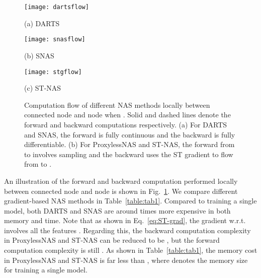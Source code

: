 \documentclass{article}
\newcommand{\figref}{Fig.~\ref}
\newcommand{\tabref}{Table~\ref}
\newcommand{\neqref}{Eq.~\eqref}
\begin{document}
\begin{figure}[t]
    \begin{minipage}[b]{0.32\linewidth}
        \centering
        \texttt{[image: dartsflow]}
\centerline{(a) DARTS}\medskip
    \end{minipage}
    \begin{minipage}[b]{0.32\linewidth}
        \centering
        \texttt{[image: snasflow]}
\centerline{(b) SNAS}\medskip
    \end{minipage}
    \begin{minipage}[b]{0.32\linewidth}
        \centering
        \texttt{[image: stgflow]}
\centerline{(c) ST-NAS}\medskip
    \end{minipage}
\vspace{-4mm}
    \caption{Computation flow of different NAS methods locally between connected node and node when . Solid and dashed lines denote the forward and backward computations respectively. (a) For DARTS and SNAS, the forward is fully continuous and the backward is fully differentiable. (b) For ProxylessNAS and ST-NAS, the forward from  to  involves sampling and the backward uses the ST gradient to flow from  to .}
    \label{fig:compute-flow}
\end{figure}


An illustration of the forward and backward computation performed locally between connected node and node is shown in \figref{fig:compute-flow}.
We compare different gradient-based NAS methods in \tabref{table:tab1}.
Compared to training a single model, both DARTS and SNAS are around  times more expensive in both memory and time.
Note that as shown in \neqref{eq:ST-grad}, the gradient w.r.t.~ involves all the  features .
Regarding this, the backward computation complexity in ProxylessNAS and ST-NAS can be reduced to be , but the forward computation complexity is still .
As shown in \tabref{table:tab1}, the memory cost in ProxylessNAS and ST-NAS is far less than , where  denotes the memory size for training a single model.
\end{document}

